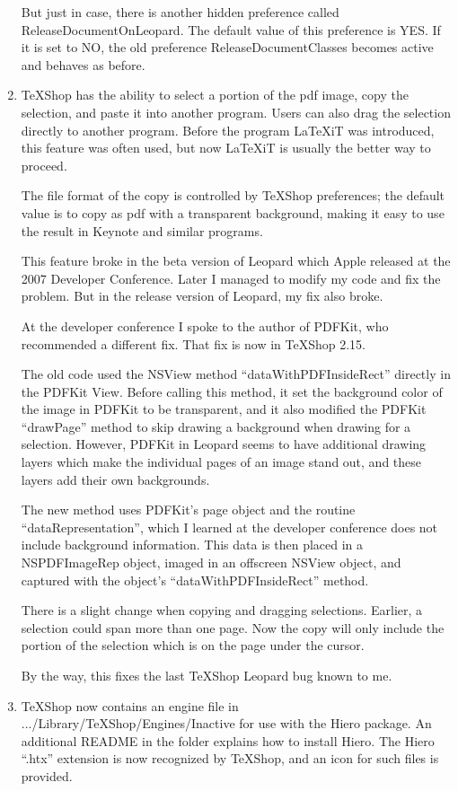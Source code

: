 \documentclass[11pt, oneside]{amsart}
\begin{document}
\begin{enumerate}
But just in case, there is another hidden preference called ReleaseDocumentOnLeopard. The default value of this preference is YES. If it is set to NO, the old preference ReleaseDocumentClasses becomes active and behaves as before.

\item TeXShop has the ability to select a portion of the pdf image, copy the selection, and paste it into another program. Users can also drag the selection directly to another program. Before the program LaTeXiT was introduced, this feature was often used, but now LaTeXiT is usually the better way to proceed. 

The file format of the copy is controlled by TeXShop preferences; the default value is to copy as pdf with a transparent background, making it easy to use the result in Keynote and similar programs.

This feature broke in the beta version of Leopard which Apple released at the 2007 Developer Conference. Later I managed to modify my code and fix the problem. But in the release version of Leopard, my fix also broke.

At the developer conference I spoke to the author of PDFKit, who recommended a different fix. That fix is now in TeXShop 2.15.

The old code used the NSView method ``dataWithPDFInsideRect'' directly in the PDFKit View. Before calling this method, it set the background color of the image in PDFKit to be transparent, and it also modified the PDFKit ``drawPage'' method to skip drawing a background when drawing for a selection. However, PDFKit in Leopard seems to have additional drawing layers which make the individual pages of an image stand out, and these layers add their own backgrounds. 

The new method uses PDFKit's page object and the routine ``dataRepresentation'', which I learned at the developer conference does not include background information. This data is then placed in a NSPDFImageRep object, imaged in an offscreen NSView object, and captured with the object's ``dataWithPDFInsideRect'' method. 

There is a slight change when copying and dragging selections. Earlier, a selection could span more than one page. Now the copy will only include the portion of the selection which is on the page under the cursor.

By the way, this fixes the last TeXShop Leopard bug known to me. 

\item TeXShop now contains an engine file in .../Library/TeXShop/Engines/Inactive for use with the Hiero package. An additional README in the folder explains how to install Hiero. The Hiero ``.htx'' extension is now recognized by TeXShop, and an icon for such files is provided.


\end{enumerate}
\end{document}

